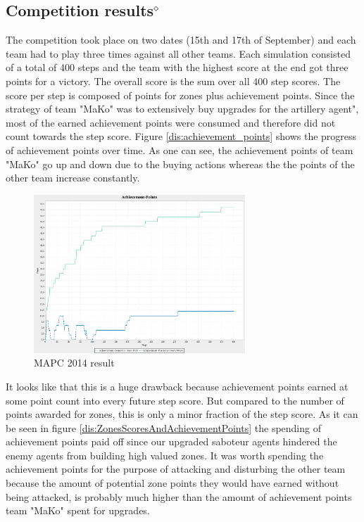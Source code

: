 \subsection{Competition results$^\diamond$}
The competition took place on two dates (15th and 17th of September) and each team had to play three times against all other teams. Each simulation consisted of a total of 400 steps and the team with the highest score at the end got three points for a victory. The overall score is the sum over all 400 step scores. The score per step is composed of points for zones plus achievement points. Since the strategy of team "MaKo" was to extensively buy upgrades for the artillery agent", most of the earned achievement points were consumed and therefore did not count towards the step score. Figure \autoref{dis:achievement_points} shows the progress of achievement points over time. As one can see, the achievement points of team "MaKo" go up and down due to the buying actions whereas the the points of the other team increase constantly. 
\begin{figure}[ht]
	\centering
	\includegraphics[width=300px]{images/AchievementPoints.png}
	\caption{MAPC 2014 result}
	\label{dis:achievement_points}
\end{figure}
It looks like that this is a huge drawback because achievement points earned at some point count into every future step score. But compared to the number of points awarded for zones, this is only a minor fraction of the step score. As it can be seen in figure \autoref{dis:ZonesScoresAndAchievementPoints} the spending of achievement points paid off since our upgraded saboteur agents hindered the enemy agents from building high valued zones. It was worth spending the achievement points for the purpose of attacking and disturbing the other team because the amount of potential zone points they would have earned without being attacked, is probably much higher than the amount of achievement points team "MaKo" spent for upgrades.
